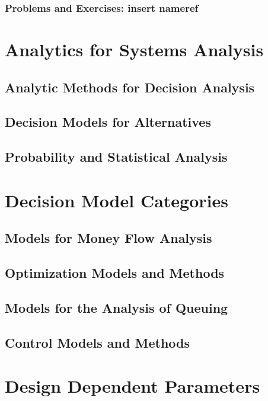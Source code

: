 \documentclass[11pt,fleqn]{book} %
\newcommand{\problems}[1]{} %
\begin{document}
    \section{Problems and Exercises: insert nameref}
      \problems{08}
  
\part{Analytics for Systems Analysis}

  \chapter{Analytic Methods for Decision Analysis}
  
  \chapter{Decision Models for Alternatives}
  
  \chapter{Probability and Statistical Analysis}
  
\part{Decision Model Categories}

  \chapter{Models for Money Flow Analysis}
  
  \chapter{Optimization Models and Methods}
  
  \chapter{Models for the Analysis of Queuing}
  
  \chapter{Control Models and Methods}
  
\part{Design Dependent Parameters}
  
\end{document}
